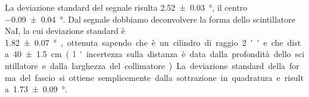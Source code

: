 La deviazione standard del segnale risulta \SI{2.52 \pm 0.03}{\degree},
il centro \SI{-0.09 \pm 0.04}{\degree}.
Dal segnale dobbiamo deconvolvere la forma dello scintillatore NaI,
la cui deviazione standard è \SI{1.82 \pm 0.07}\degree, ottenuta sapendo che è un cilindro di raggio \SI{2}{''}
e che dista \SI{40\pm 1.5}{cm} (l'incertezza sulla distanza è data dalla profondità dello scintillatore e dalla larghezza del collimatore).
La deviazione standard della forma del fascio si ottiene semplicemente dalla sottrazione in quadratura
e risulta \SI{1.73 \pm 0.09}{\degree}.
